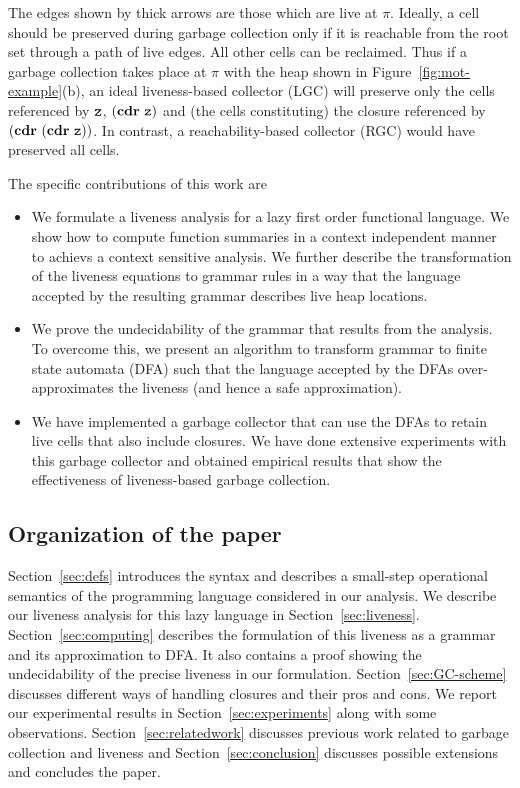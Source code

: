 \documentclass[9pt]{sigplanconf}
\newcommand{\mycomment}[1]{}
\begin{document}
The edges  shown by thick  arrows are those  which are live  at $\pi$.
Ideally, a cell should be  preserved during garbage collection only if
it is reachable from  the root set through a path  of live edges.  All
other  cells can  be reclaimed.   Thus if  a garbage  collection takes
place at $\pi$ with the heap shown in Figure~\ref{fig:mot-example}(b),
an ideal liveness-based  collector (LGC) will preserve  only the cells
referenced by  $\mbox{\tt z}$, $(\mbox{$\mathbf{cdr}$}~ \mbox{\tt z})$  and (the cells  constituting) the
closure   referenced   by   $(\mbox{$\mathbf{cdr}$}~(\mbox{$\mathbf{cdr}$}~\mbox{\tt z}))$.    In   contrast,   a
reachability-based collector (RGC) would have preserved all cells.

The specific contributions of this work are
  \begin{itemize}
  \item  We formulate  a  liveness  analysis for  a  lazy first  order
    functional language. We show how  to compute function summaries in
    a  context  independent  manner  to achievs  a  context  sensitive
    analysis. We  further describe the transformation  of the liveness
    equations to grammar rules in a  way that the language accepted by
    the resulting grammar describes live heap locations.\mycomment{the
      proof of its correctness}
  \item We prove  the undecidability of the grammar  that results from
    the  analysis.   To overcome  this,  we  present an  algorithm  to
    transform grammar  to finite  state automata  (DFA) such  that the
    language accepted by the  DFAs over-approximates the liveness (and
    hence a safe approximation).
  \item We have implemented a garbage  collector that can use the DFAs
    to  retain live  cells that  also include  closures. We  have done
    extensive  experiments with  this garbage  collector and  obtained
    empirical results  that show  the effectiveness  of liveness-based
    garbage collection.
  \end{itemize}

\subsection{Organization of the paper}

{\color  {Myblue}Section~\ref{sec:defs}  introduces   the  syntax  and
  describes  a small-step  operational  semantics  of the  programming
  language  considered  in our  analysis.   We  describe our  liveness
  analysis  for  this  lazy  language  in  Section~\ref{sec:liveness}.
  Section~\ref{sec:computing}  describes   the  formulation   of  this
  liveness as a grammar and its approximation to DFA. It also contains
  a proof  showing the undecidability  of the precise liveness  in our
  formulation.   Section~\ref{sec:GC-scheme} discusses  different ways
  of  handling  closures and  their  pros  and  cons.  We  report  our
  experimental  results  in Section~\ref{sec:experiments}  along  with
  some observations.  Section~\ref{sec:relatedwork} discusses previous
  work   related    to   garbage    collection   and    liveness   and
  Section~\ref{sec:conclusion}   discusses  possible   extensions  and
  concludes the paper.  }
\end{document}
